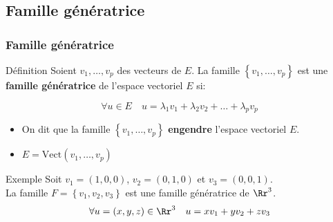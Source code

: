 \documentclass[dvipsnames]{beamer}
\begin{document}
\subsection{Famille génératrice}

\begin{frame}[t]
  \frametitle{Famille génératrice}
  \begin{block}{Définition}
    \small
    Soient $v_1,\ldots, v_p$ des vecteurs de $E$. La famille
    $\left\{v_1,\ldots,v_p\right\}$   est une \textbf{\alert{famille
    génératrice}} de l'espace vectoriel $E$ si:

    \begin{equation}
      \forall u\in E\quad u = \lambda_1 v_1 + \lambda_2 v_2 +\ldots + \lambda_p
      v_p
    \end{equation}
  \end{block}
  
  \begin{itemize}
    \small
    \item On dit que la famille $\left\{v_1, \ldots, v_p\right\}$
      \textbf{\alert{engendre}} l'espace vectoriel $E$.\\[4pt]
    \item $E = \text{Vect}(v_1,\ldots, v_p)$
  \end{itemize}

  \begin{block}{Exemple}
    \scriptsize
    Soit $v_1= (1,0,0)$, $v_2=(0,1,0)$ et $v_3=(0,0,1)$.\\[4pt]
    La famille $F=\left\{v_1, v_2, v_3\right\}$ est une famille génératrice de
    $\Rr^3$.\\[4pt]

    \begin{equation*}
      \forall u=(x,y,z)\in \Rr^3\quad  u = x v_1 + y v_2 + z v_3
    \end{equation*}
\end{block}
\end{frame}
\end{document}
